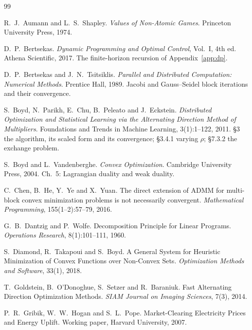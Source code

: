\documentclass[11pt,a4paper]{article}
\begin{document}
\begin{thebibliography}{99}

R.~J.~Aumann and L.~S.~Shapley.
\newblock \emph{Values of Non-Atomic Games}.
\newblock Princeton University Press, 1974.

D.~P.~Bertsekas.
\newblock \emph{Dynamic Programming and Optimal Control}, Vol.~I, 4th ed.
\newblock Athena Scientific, 2017.
\newblock The finite-horizon recursion of Appendix~\ref{app:dp}.

D.~P.~Bertsekas and J.~N.~Tsitsiklis.
\newblock \emph{Parallel and Distributed Computation: Numerical Methods}.
\newblock Prentice Hall, 1989.
\newblock Jacobi and Gauss--Seidel block iterations and their convergence.

S.~Boyd, N.~Parikh, E.~Chu, B.~Peleato and J.~Eckstein.
\newblock \emph{Distributed Optimization and Statistical Learning via the
Alternating Direction Method of Multipliers}.
\newblock Foundations and Trends in Machine Learning, 3(1):1--122, 2011.
\newblock \S3 the algorithm, its scaled form and its convergence; \S3.4.1
varying $\rho$; \S7.3.2 the exchange problem.

S.~Boyd and L.~Vandenberghe.
\newblock \emph{Convex Optimization}.
\newblock Cambridge University Press, 2004.
\newblock Ch.~5: Lagrangian duality and weak duality.

C.~Chen, B.~He, Y.~Ye and X.~Yuan.
\newblock The direct extension of ADMM for multi-block convex minimization
problems is not necessarily convergent.
\newblock \emph{Mathematical Programming}, 155(1--2):57--79, 2016.

G.~B.~Dantzig and P.~Wolfe.
\newblock Decomposition Principle for Linear Programs.
\newblock \emph{Operations Research}, 8(1):101--111, 1960.

S.~Diamond, R.~Takapoui and S.~Boyd.
\newblock A General System for Heuristic Minimization of Convex Functions over
Non-Convex Sets.
\newblock \emph{Optimization Methods and Software}, 33(1), 2018.

T.~Goldstein, B.~O'Donoghue, S.~Setzer and R.~Baraniuk.
\newblock Fast Alternating Direction Optimization Methods.
\newblock \emph{SIAM Journal on Imaging Sciences}, 7(3), 2014.

P.~R.~Gribik, W.~W.~Hogan and S.~L.~Pope.
\newblock Market-Clearing Electricity Prices and Energy Uplift.
\newblock Working paper, Harvard University, 2007.


\end{thebibliography}
\end{document}
